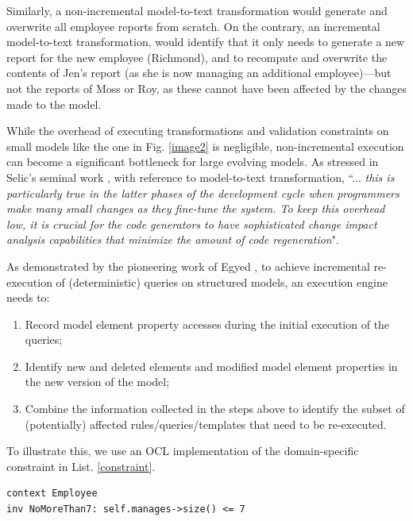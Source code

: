 \documentclass{llncs}
\begin{document}
Similarly, a non-incremental model-to-text transformation would generate and overwrite all employee reports from scratch. On the contrary, an incremental model-to-text transformation, would identify that it only needs to generate a new report for the new employee (Richmond), and to recompute and overwrite the contents of Jen's report (as she is now managing an additional employee)---but not the reports of Moss or Roy, as these cannot have been affected by the changes made to the model.

While the overhead of executing transformations and validation constraints on small models like the one in Fig. \ref{image2} is negligible, non-incremental execution can become a significant bottleneck for large evolving models. As stressed in Selic's seminal work \cite{selic2003pragmatics}, with reference to model-to-text transformation, ``... \emph{this is particularly true in the latter phases of the development cycle when programmers make many small changes as they fine-tune the system. To keep this overhead low, it is crucial for the code generators to have sophisticated change impact analysis capabilities that minimize the amount of code regeneration}".

As demonstrated by the pioneering work of Egyed \cite{egyed2011automatically}, to achieve incremental re-execution of (deterministic) queries on structured models, an execution engine needs to:

\begin{enumerate}
\item Record model element property accesses during the initial execution of the queries;
\item Identify new and deleted elements and modified model element properties in the new version of the model;
\item Combine the information collected in the steps above to identify the subset of (potentially) affected rules/queries/templates that need to be re-executed.
\end{enumerate}

To illustrate this, we use an OCL implementation of the domain-specific constraint in List. \ref{constraint}.

\begin{lstlisting}[style=ocl,caption={OCL constraint requiring that no employee directly manages more than 7 other employees.},label=constraint]
context Employee
inv NoMoreThan7: self.manages->size() <= 7
\end{lstlisting}
\end{document}
